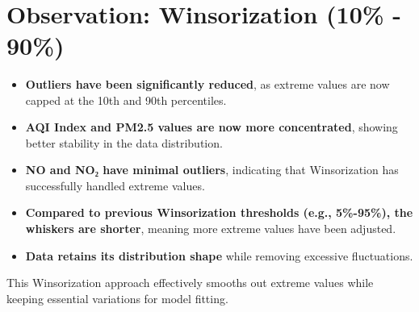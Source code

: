 \documentclass[11pt]{article}
\providecommand{\tightlist}{%
      \setlength{\itemsep}{0pt}\setlength{\parskip}{0pt}}
\begin{document}
    \begin{center}
    \end{center}
    { \hspace*{\fill} \\}
    
    \hypertarget{observation-winsorization-10---90}{%
\section{\texorpdfstring{\textbf{Observation: Winsorization (10\% -
90\%)}}{Observation: Winsorization (10\% - 90\%)}}\label{observation-winsorization-10---90}}

\begin{itemize}
\tightlist
\item
  \textbf{Outliers have been significantly reduced}, as extreme values
  are now capped at the 10th and 90th percentiles.
\item
  \textbf{AQI Index and PM2.5 values are now more concentrated}, showing
  better stability in the data distribution.
\item
  \textbf{NO and NO₂ have minimal outliers}, indicating that
  Winsorization has successfully handled extreme values.
\item
  \textbf{Compared to previous Winsorization thresholds (e.g.,
  5\%-95\%), the whiskers are shorter}, meaning more extreme values have
  been adjusted.
\item
  \textbf{Data retains its distribution shape} while removing excessive
  fluctuations.
\end{itemize}

This Winsorization approach effectively smooths out extreme values while
keeping essential variations for model fitting.
\end{document}
